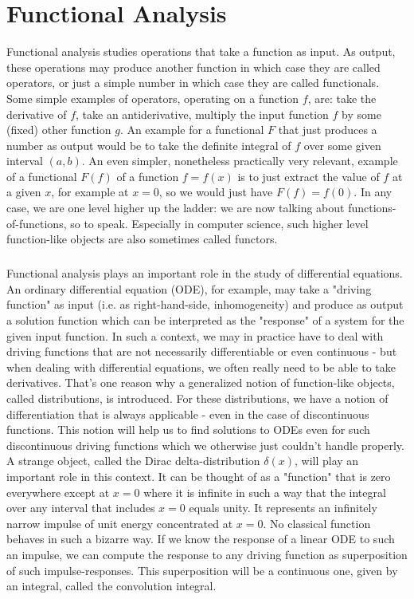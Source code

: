 \chapter{Functional Analysis}
Functional analysis studies operations that take a function as input. As output, these operations may produce another function in which case they are called operators, or just a simple number in which case they are called functionals. Some simple examples of operators, operating on a function $f$, are: take the derivative of $f$, take an antiderivative, multiply the input function $f$ by some (fixed) other function $g$. An example for a functional $F$ that just produces a number as output would be to take the definite integral of $f$ over some given interval $(a,b)$. An even simpler, nonetheless practically very relevant, example of a functional $F(f)$ of a function $f = f(x)$ is to just extract the value of $f$ at a given $x$, for example at $x=0$, so we would just have $F(f) = f(0)$. In any case, we are one level higher up the ladder: we are now talking about functions-of-functions, so to speak. Especially in computer science, such higher level function-like objects are also sometimes called functors. 

\paragraph{}
Functional analysis plays an important role in the study of differential equations. An ordinary differential equation (ODE), for example, may take a "driving function" as input (i.e. as right-hand-side, inhomogeneity) and produce as output a solution function which can be interpreted as the "response" of a system for the given input function. In such a context, we may in practice have to deal with driving functions that are not necessarily differentiable or even continuous - but when dealing with differential equations, we often really need to be able to take derivatives. That's one reason why a generalized notion of function-like objects, called distributions, is introduced. For these distributions, we have a notion of differentiation that is always applicable - even in the case of discontinuous functions. This notion will help us to find solutions to ODEs even for such discontinuous driving functions which we otherwise just couldn't handle properly. A strange object, called the Dirac delta-distribution $\delta(x)$, will play an important role in this context. It can be thought of as a "function" that is zero everywhere except at $x=0$ where it is infinite in such a way that the integral over any interval that includes $x=0$ equals unity. It represents an infinitely narrow impulse of unit energy concentrated at $x=0$. No classical function behaves in such a bizarre way. If we know the response of a linear ODE to such an impulse, we can compute the response to any driving function as superposition of such impulse-responses. This superposition will be a continuous one, given by an integral, called the convolution integral.

